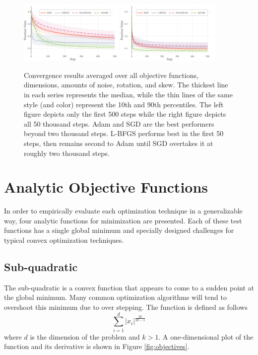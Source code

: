 \documentclass[letterpaper, 10 pt, conference]{IEEEtran}  %
\begin{document}
\begin{figure}
  \centering
  \includegraphics[width=0.45\textwidth]{Figures/final-algorithm-500}
  \hspace{5mm}
  \includegraphics[width=0.45\textwidth]{Figures/final-algorithm-50K}
  \caption{Convergence results averaged over all objective functions,
    dimensions, amounts of noise, rotation, and skew. The thickest
    line in each series represents the median, while the thin lines of
    the same style (and color) represent the 10th and 90th
    percentiles. The left figure depicts only the first 500 steps
    while the right figure depicts all 50 thousand steps. Adam and SGD
    are the best performers beyond two thousand steps. L-BFGS
    performs best in the first 50 steps, then remains second to Adam
    until SGD overtakes it at roughly two thousand steps.}
  \label{fig:results-all}
\end{figure}

\section{Analytic Objective Functions}

In order to empirically evaluate each optimization technique in a
generalizable way, four analytic functions for minimization are
presented.  Each of these test functions has a single global minimum
and specially designed challenges for typical convex optimization
techniques.

\subsection{Sub-quadratic}

The sub-quadratic is a convex function that appears to come to a
sudden point at the global minimum.  Many common optimization
algorithms will tend to overshoot this minimum due to over stepping.
The function is defined as follows
$$ \sum_{i=1}^{d} |x_i|^{\frac{2k}{2k-1}} $$
where $d$ is the dimension of the problem and $k > 1$.  A
one-dimensional plot of the function and its derivative is shown in
Figure \ref{fig:objectives}.
\end{document}
